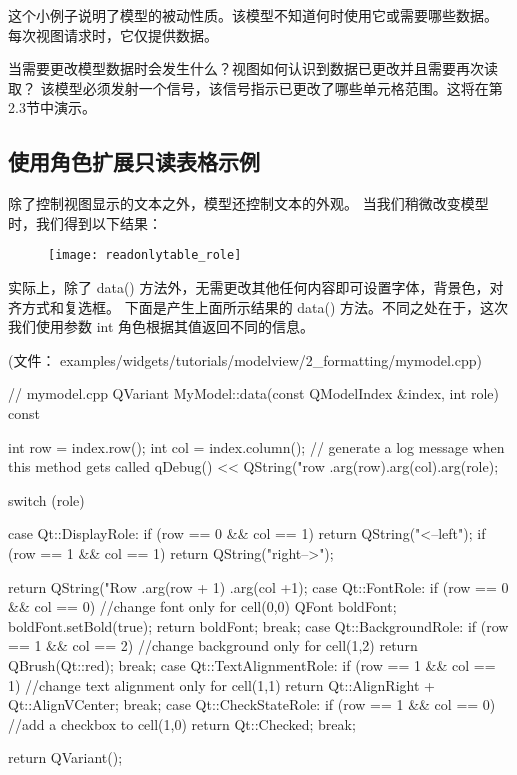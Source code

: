 这个小例子说明了模型的被动性质。该模型不知道何时使用它或需要哪些数据。
每次视图请求时，它仅提供数据。

当需要更改模型数据时会发生什么？视图如何认识到数据已更改并且需要再次读取？
该模型必须发射一个信号，该信号指示已更改了哪些单元格范围。这将在第2.3节中演示。

\subsection{使用角色扩展只读表格示例}

除了控制视图显示的文本之外，模型还控制文本的外观。
当我们稍微改变模型时，我们得到以下结果：

\begin{figure}[hbt!]  
\texttt{[image: readonlytable\_role]}
\end{figure}

实际上，除了 data() 方法外，无需更改其他任何内容即可设置字体，背景色，对齐方式和复选框。
下面是产生上面所示结果的 data() 方法。不同之处在于，这次我们使用参数 int 角色根据其值返回不同的信息。

(文件： examples/widgets/tutorials/modelview/2\_formatting/mymodel.cpp)

\begin{cppcode}
// mymodel.cpp
QVariant MyModel::data(const QModelIndex &index, int role) const
{
    int row = index.row();
    int col = index.column();
    // generate a log message when this method gets called
    qDebug() << QString("row %
            .arg(row).arg(col).arg(role);

    switch (role) {
    case Qt::DisplayRole:
        if (row == 0 && col == 1) return QString("<--left");
        if (row == 1 && col == 1) return QString("right-->");

        return QString("Row%
                .arg(row + 1)
                .arg(col +1);
    case Qt::FontRole:
        if (row == 0 && col == 0) { //change font only for cell(0,0)
            QFont boldFont;
            boldFont.setBold(true);
            return boldFont;
        }
        break;
    case Qt::BackgroundRole:
        if (row == 1 && col == 2)  //change background only for cell(1,2)
            return QBrush(Qt::red);
        break;
    case Qt::TextAlignmentRole:
        if (row == 1 && col == 1) //change text alignment only for cell(1,1)
            return Qt::AlignRight + Qt::AlignVCenter;
        break;
    case Qt::CheckStateRole:
        if (row == 1 && col == 0) //add a checkbox to cell(1,0)
            return Qt::Checked;
        break;
    }
    return QVariant();
}
\end{cppcode}

